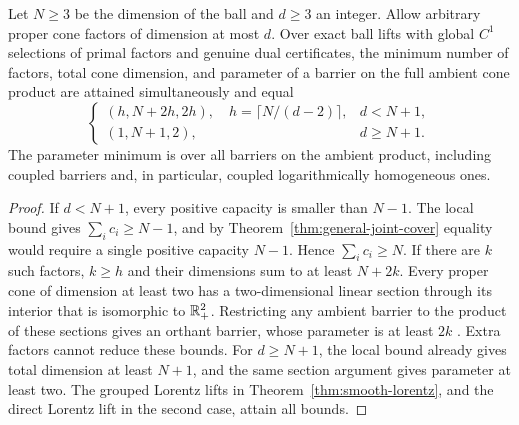 \begin{corollary}
\label{cor:proper-smooth-frontier}
Let $N\geq3$ be the dimension of the ball and $d\geq3$ an integer.
Allow arbitrary proper cone factors of dimension at most $d$. Over exact
ball lifts with global $C^1$ selections of primal factors and genuine
dual certificates, the minimum number of factors, total cone dimension,
and parameter of a barrier on the full ambient cone product are attained
simultaneously and equal
\[
 \begin{cases}
 (h,N+2h,2h),\quad h=\lceil N/(d-2)\rceil,&d<N+1,\\
 (1,N+1,2),&d\geq N+1.
 \end{cases}
\]
The parameter minimum is over all barriers on the ambient product,
including coupled barriers and, in particular, coupled logarithmically
homogeneous ones.
\end{corollary}
\begin{proof}
If $d<N+1$, every positive capacity is smaller than $N-1$.
The local bound gives $\sum_ic_i\geq N-1$, and by
Theorem~\ref{thm:general-joint-cover} equality would require a single
positive capacity $N-1$. Hence $\sum_ic_i\geq N$. If there are $k$ such factors,
$k\geq h$ and their dimensions sum to at least $N+2k$.
Every proper cone of dimension at least two has a two-dimensional linear
section through its interior that is isomorphic to $\mathbb R_+^2$.
Restricting any ambient barrier to the product of these sections gives
an orthant barrier, whose parameter is at least $2k$
\cite[Proposition~2.3.6]{NN1994}. Extra factors cannot reduce these bounds.
For $d\geq N+1$, the local bound already gives total dimension at least
$N+1$, and the same section argument gives parameter at least two.
The grouped Lorentz lifts in Theorem~\ref{thm:smooth-lorentz}, and the
direct Lorentz lift in the second case, attain all bounds.
\end{proof}

